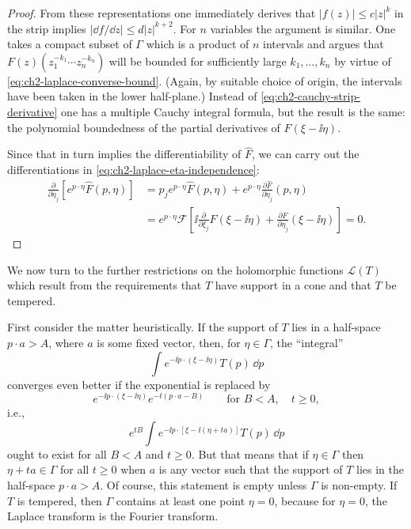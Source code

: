 \begin{proof}
From these representations one immediately derives that $|f(z)|\leq
c|z|^k$ in the strip implies $|\dd f/\dd z|\leq d|z|^{k+2}$.  For $n$
variables the argument is similar.  One takes a compact subset of $\Gamma$
which is a product of $n$ intervals and argues that
$F(z)(z_1^{-k_1}\cdots z_n^{-k_n})$ will be bounded for sufficiently large
$k_1,\ldots,k_n$ by virtue of \eqref{eq:ch2-laplace-converse-bound}.  (Again, by suitable choice of
origin, the intervals have been taken in the lower half-plane.)  Instead of
\eqref{eq:ch2-cauchy-strip-derivative} one has a multiple Cauchy integral formula, but the result is the
same: the polynomial boundedness of the partial derivatives of
$F(\xi-\ii\eta)$.



Since that in turn implies the differentiability of $\widehat{F}$, we can
carry out the differentiations in \eqref{eq:ch2-laplace-eta-independence}:
\begin{align*}
  \frac{\partial}{\partial\eta_j}
  [e^{p\cdot\eta}\widehat{F}(p,\eta)]
  &=p_j e^{p\cdot\eta}\widehat{F}(p,\eta)
    +e^{p\cdot\eta}\frac{\partial\widehat{F}}{\partial\eta_j}(p,\eta) \\
  &=e^{p\cdot\eta}\mathcal{F}
    \left[\ii\frac{\partial}{\partial\xi_j}F(\xi-\ii\eta)
    +\frac{\partial F}{\partial\eta_j}(\xi-\ii\eta)\right]=0 .
\end{align*}

\end{proof}

We now turn to the further restrictions on the holomorphic functions
$\mathcal{L}(T)$ which result from the requirements that $T$ have support
in a cone and that $T$ be tempered.

First consider the matter heuristically.  If the support of $T$ lies in a
half-space $p\cdot a>A$, where $a$ is some fixed vector, then, for
$\eta\in\Gamma$, the ``integral''
\begin{equation}
  \int e^{-\ii p\cdot(\xi-\ii\eta)}T(p)\,\dd p
  \tag{2-76}\label{eq:ch2-laplace-support-integral}
\end{equation}
converges even better if the exponential is replaced by
\begin{equation*}
  e^{-\ii p\cdot(\xi-\ii\eta)}e^{-t(p\cdot a-B)}
  \qquad\text{for }B<A,\quad t\geq0,
\end{equation*}
i.e.,
\begin{equation*}
  e^{tB}\int e^{-\ii p\cdot[\xi-\ii(\eta+ta)]}T(p)\,\dd p
\end{equation*}
ought to exist for all $B<A$ and $t\geq0$.  But that means that if
$\eta\in\Gamma$ then $\eta+ta\in\Gamma$ for all $t\geq0$ when $a$ is any
vector such that the support of $T$ lies in the half-space
$p\cdot a>A$.  Of course, this statement is empty unless $\Gamma$ is
non-empty.  If $T$ is tempered, then $\Gamma$ contains at least one point
$\eta=0$, because for $\eta=0$, the Laplace transform is the Fourier
transform.

